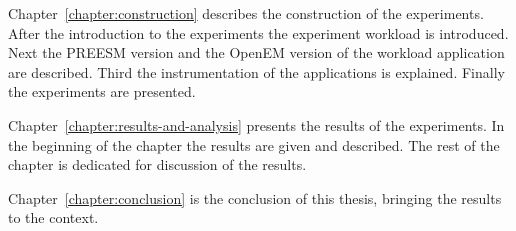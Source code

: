Chapter~\ref{chapter:construction} describes the construction of the experiments. After the introduction to the experiments the experiment workload is introduced. Next the PREESM version and the OpenEM version of the workload application are described. Third the instrumentation of the applications is explained. Finally the experiments are presented.

Chapter~\ref{chapter:results-and-analysis} presents the results of the experiments. In the beginning of the chapter the results are given and described. The rest of the chapter is dedicated for discussion of the results.

Chapter~\ref{chapter:conclusion} is the conclusion of this thesis, bringing the results to the context.
